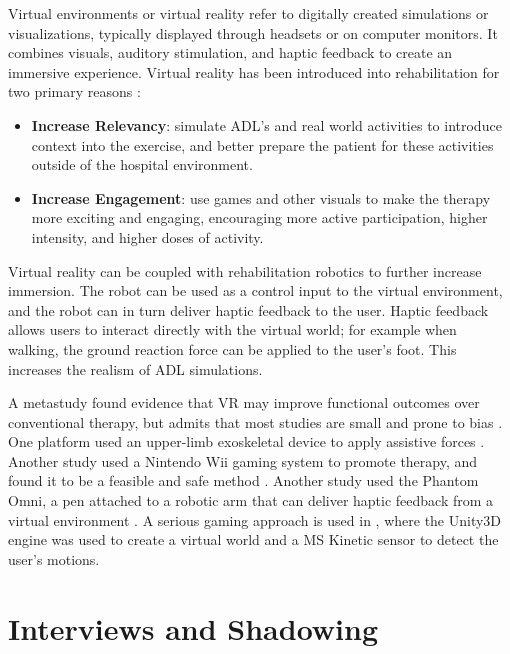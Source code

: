 \documentclass[12pt]{report}
\begin{document}
	Virtual environments or virtual reality refer to digitally created simulations or visualizations, typically displayed through headsets or on computer monitors. It combines visuals, auditory stimulation, and haptic feedback to create an immersive experience. Virtual reality has been introduced into rehabilitation for two primary reasons \cite{Laver2015}:
	\begin{itemize}
		\item \textbf{Increase Relevancy}: simulate ADL's and real world activities to introduce context into the exercise, and better prepare the patient for these activities outside of the hospital environment. 
		\item \textbf{Increase Engagement}: use games and other visuals to make the therapy more exciting and engaging, encouraging more active participation, higher intensity, and higher doses of activity. 
	\end{itemize}

	Virtual reality can be coupled with rehabilitation robotics to further increase immersion. The robot can be used as a control input to the virtual environment, and the robot can in turn deliver haptic feedback to the user. Haptic feedback allows users to interact directly with the virtual world; for example when walking, the ground reaction force can be applied to the user's foot. This increases the realism of ADL simulations. 
	
	A metastudy found evidence that VR may improve functional outcomes over conventional therapy, but admits that most studies are small and prone to bias \cite{Laver2015}. One platform used an upper-limb exoskeletal device to apply assistive forces  \cite{Patel2015}. Another study used a Nintendo Wii gaming system to promote therapy, and found it to be a feasible and safe method  \cite{Saposnik2010}. Another study used the Phantom Omni, a pen attached to a robotic arm that can deliver haptic feedback from a virtual environment \cite{Jiang2017}. A serious gaming approach is used in \cite{SociedadeBrasileiradeInformaticaemSaude2014}, where the Unity3D engine was used to create a virtual world and a MS Kinetic sensor to detect the user's motions. 
	

	
\section{Interviews and Shadowing}

%
	
\end{document}
